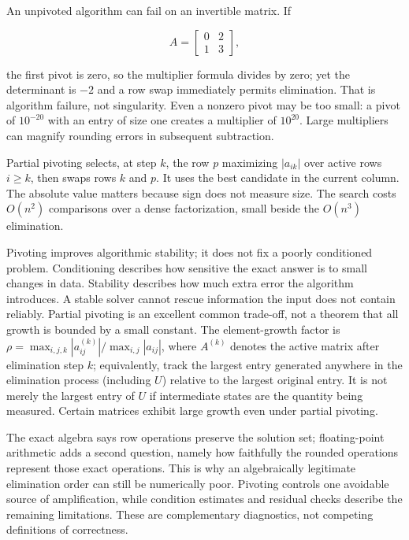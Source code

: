 An unpivoted algorithm can fail on an invertible matrix. If

\[
A=\begin{bmatrix}0&2\\1&3\end{bmatrix},
\]

the first pivot is zero, so the multiplier formula divides by zero; yet the determinant is \(-2\) and a row swap immediately permits elimination. That is algorithm failure, not singularity. Even a nonzero pivot may be too small: a pivot of \(10^{-20}\) with an entry of size one creates a multiplier of \(10^{20}\). Large multipliers can magnify rounding errors in subsequent subtraction.

Partial pivoting selects, at step \(k\), the row \(p\) maximizing \(|a_{ik}|\) over active rows \(i\ge k\), then swaps rows \(k\) and \(p\). It uses the best candidate in the current column. The absolute value matters because sign does not measure size. The search costs \(O(n^2)\) comparisons over a dense factorization, small beside the \(O(n^3)\) elimination.

Pivoting improves algorithmic stability; it does not fix a poorly conditioned problem. Conditioning describes how sensitive the exact answer is to small changes in data. Stability describes how much extra error the algorithm introduces. A stable solver cannot rescue information the input does not contain reliably. Partial pivoting is an excellent common trade-off, not a theorem that all growth is bounded by a small constant. The element-growth factor is \(\rho=\max_{i,j,k}|a_{ij}^{(k)}|/\max_{i,j}|a_{ij}|\), where \(A^{(k)}\) denotes the active matrix after elimination step \(k\); equivalently, track the largest entry generated anywhere in the elimination process (including \(U\)) relative to the largest original entry. It is not merely the largest entry of \(U\) if intermediate states are the quantity being measured. Certain matrices exhibit large growth even under partial pivoting.

The exact algebra says row operations preserve the solution set; floating-point arithmetic adds a second question, namely how faithfully the rounded operations represent those exact operations. This is why an algebraically legitimate elimination order can still be numerically poor. Pivoting controls one avoidable source of amplification, while condition estimates and residual checks describe the remaining limitations. These are complementary diagnostics, not competing definitions of correctness.

